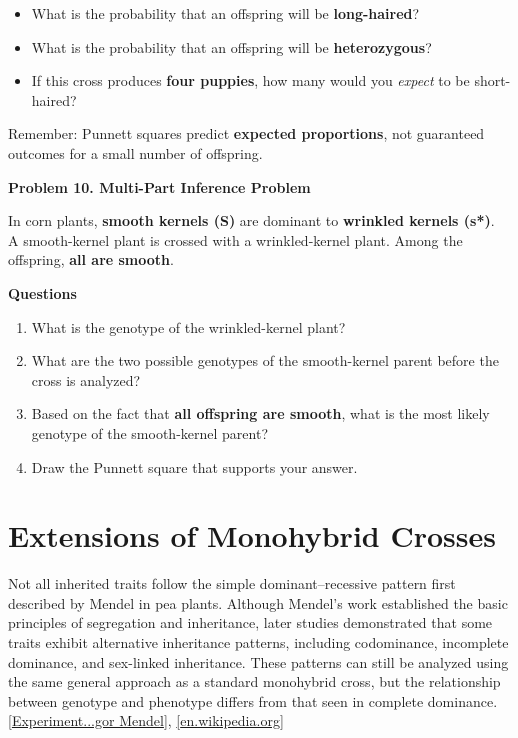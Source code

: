 \documentclass[
  letterpaper,
  DIV=11,
  numbers=noendperiod]{scrreprt}
\begin{document}
\begin{itemize}
\item
  What is the probability that an offspring will be
  \textbf{long-haired}?
\item
  What is the probability that an offspring will be
  \textbf{heterozygous}?
\item
  If this cross produces \textbf{four puppies}, how many would you
  \emph{expect} to be short-haired?
\end{itemize}

Remember: Punnett squares predict \textbf{expected proportions}, not
guaranteed outcomes for a small number of offspring.

\textbf{Problem 10. Multi-Part Inference Problem}

In corn plants, \textbf{smooth kernels (S)} are dominant to
\textbf{wrinkled kernels (s*)}.\\
A smooth-kernel plant is crossed with a wrinkled-kernel plant. Among the
offspring, \textbf{all are smooth}.

\textbf{Questions}

\begin{enumerate}
\def\labelenumi{\arabic{enumi}.}
\item
  What is the genotype of the wrinkled-kernel plant?
\item
  What are the two possible genotypes of the smooth-kernel parent before
  the cross is analyzed?
\item
  Based on the fact that \textbf{all offspring are smooth}, what is the
  most likely genotype of the smooth-kernel parent?
\item
  Draw the Punnett square that supports your answer.
\end{enumerate}

\textbf{\hfill\break
}

\section{\texorpdfstring{\textbf{Extensions of Monohybrid
Crosses}}{Extensions of Monohybrid Crosses}}\label{extensions-of-monohybrid-crosses}

Not all inherited traits follow the simple dominant--recessive pattern
first described by Mendel in pea plants. Although Mendel's work
established the basic principles of segregation and inheritance, later
studies demonstrated that some traits exhibit alternative inheritance
patterns, including codominance, incomplete dominance, and sex-linked
inheritance. These patterns can still be analyzed using the same general
approach as a standard monohybrid cross, but the relationship between
genotype and phenotype differs from that seen in complete dominance.
\href{http://www.mendelianum.cz/images/files/Mendel-paper-1866-english.pdf}{{[}Experiment...gor
Mendel{]}},
\href{https://en.wikipedia.org/wiki/Experiments_on_Plant_Hybridization}{{[}en.wikipedia.org{]}}
\end{document}
